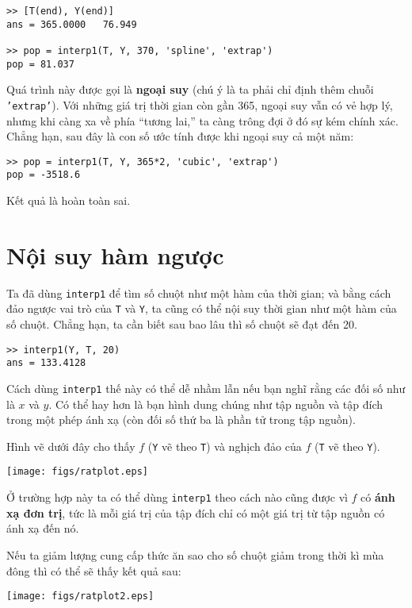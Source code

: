 \documentclass[12pt]{book}
\begin{document}
\begin{verbatim}
>> [T(end), Y(end)]
ans = 365.0000   76.949

>> pop = interp1(T, Y, 370, 'spline', 'extrap')
pop = 81.037
\end{verbatim}
%
Quá trình này được gọi là  {\bf ngoại suy} (chú ý là ta phải chỉ định 
thêm chuỗi \texttt{'extrap'}).  Với những giá trị thời gian 
còn gần 365, ngoại suy vẫn có vẻ hợp lý, nhưng khi càng xa về phía 
``tương lai,'' ta càng trông đợi ở đó sự kém chính xác. Chẳng hạn, 
sau đây là con số ước tính được khi ngoại suy cả một năm:

\begin{verbatim}
>> pop = interp1(T, Y, 365*2, 'cubic', 'extrap')
pop = -3518.6
\end{verbatim}
%
Kết quả là hoàn toàn sai.


\section{Nội suy hàm ngược}

Ta đã dùng {\tt interp1} để tìm số chuột như một hàm của thời gian;
và bằng cách đảo ngược vai trò của {\tt T} và {\tt Y}, ta cũng có thể 
nội suy thời gian như một hàm của số chuột. Chẳng hạn, ta cần biết 
sau bao lâu thì số chuột sẽ đạt đến 20.

\begin{verbatim}
>> interp1(Y, T, 20)
ans = 133.4128
\end{verbatim}
%
Cách dùng {\tt interp1} thế này có thể dễ nhầm lẫn nếu bạn nghĩ rằng 
các đối số như là $x$ và $y$. Có thể hay hơn là bạn hình dung chúng 
như tập nguồn và tập đích trong một phép ánh xạ (còn đối số thứ ba 
là phần tử trong tập nguồn).

Hình vẽ dưới đây cho thấy $f$ ({\tt Y} vẽ theo  {\tt T}) và nghịch đảo 
của  $f$ ({\tt T} vẽ theo {\tt Y}).

\centerline{\texttt{[image: figs/ratplot.eps]}}

Ở trường hợp này ta có thể dùng  {\tt interp1} theo cách nào cũng được 
vì  $f$ có  {\bf ánh xạ đơn trị}, tức là mỗi giá trị của tập đích chỉ có một 
giá trị từ tập nguồn có ánh xạ đến nó.

Nếu ta giảm lượng cung cấp thức ăn sao cho số chuột giảm trong thời kì 
mùa đông thì có thể sẽ thấy kết quả sau:

\centerline{\texttt{[image: figs/ratplot2.eps]}}
\end{document}
